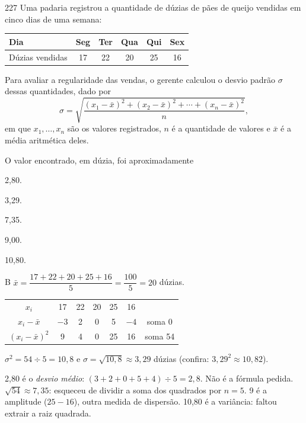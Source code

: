 \begin{questaoinedita}{2}{27}
Uma padaria registrou a quantidade de dúzias de pães de queijo vendidas em cinco dias de uma semana:
\begin{center}
\begin{tabular}{lccccc}
\toprule
Dia & Seg & Ter & Qua & Qui & Sex \\ \midrule
Dúzias vendidas & 17 & 22 & 20 & 25 & 16 \\ \bottomrule
\end{tabular}
\end{center}
Para avaliar a regularidade das vendas, o gerente calculou o desvio padrão $\sigma$ dessas
quantidades, dado por
\[ \sigma = \sqrt{\frac{(x_1 - \bar{x})^2 + (x_2 - \bar{x})^2 + \cdots + (x_n - \bar{x})^2}{n}}, \]
em que $x_1, \dots, x_n$ são os valores registrados, $n$ é a quantidade de valores e $\bar{x}$ é a
média aritmética deles.

O valor encontrado, em dúzia, foi aproximadamente
\begin{alternativas*}[5]
\item 2,80.
\item 3,29.
\item 7,35.
\item 9,00.
\item 10,80.
\end{alternativas*}
\end{questaoinedita}
\begin{resolucao}{B}
 $\bar{x} = \dfrac{17 + 22 + 20 + 25 + 16}{5} = \dfrac{100}{5} = 20$ dúzias.

\begin{center}
\begin{tabular}{cccccc|c}
\toprule
$x_i$ & 17 & 22 & 20 & 25 & 16 & \\
$x_i - \bar{x}$ & $-3$ & 2 & 0 & 5 & $-4$ & soma 0 \\
$(x_i - \bar{x})^2$ & 9 & 4 & 0 & 25 & 16 & soma 54 \\ \bottomrule
\end{tabular}
\end{center}

 $\sigma^2 = 54 \div 5 = 10{,}8$ e
$\sigma = \sqrt{10{,}8} \approx 3{,}29$ dúzias (confira: $3{,}29^2 \approx 10{,}82$).

\begin{distratores}
 2,80 é o \emph{desvio médio}: $(3 + 2 + 0 + 5 + 4) \div 5 = 2{,}8$. Não é a fórmula pedida.
 $\sqrt{54} \approx 7{,}35$: esqueceu de dividir a soma dos quadrados por $n = 5$.
 9 é a amplitude ($25 - 16$), outra medida de dispersão.
 10,80 é a variância: faltou extrair a raiz quadrada.
\end{distratores}
\end{resolucao}


